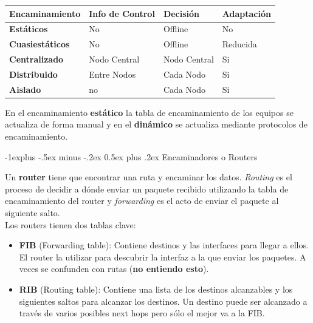 \documentclass[10pt,portrait, twocolumn]{article}
\makeatletter
\renewcommand{\subsection}{\@startsection{subsection}{2}{0mm}%
                                {-1explus -.5ex minus -.2ex}%
                                {0.5ex plus .2ex}%
                                {\normalfont\normalsize\bfseries}}
\makeatother
\begin{document}
\begin{center}
\begin{tabular}{|l|l|l|l|}
\hline
\textbf{Encaminamiento} & \textbf{Info de Control} & \textbf{Decisión} & \textbf{Adaptación} \\ \hline
\textbf{Estáticos}               & No                              & Offline                             & No                                \\ \hline
\textbf{Cuasiestáticos}          & No                              & Offline                             & Reducida                          \\ \hline
\textbf{Centralizado}            & Nodo Central                    & Nodo Central                        & Si                                \\ \hline
\textbf{Distribuido}             & Entre Nodos                     & Cada Nodo                           & Si                                \\ \hline
\textbf{Aislado}                 & no                              & Cada Nodo                           & Si                                \\ \hline
\end{tabular}
\end{center}

En el encaminamiento \textbf{estático} la tabla de encaminamiento de los equipos se actualiza de forma manual y en el \textbf{dinámico} se actualiza mediante protocolos de encaminamiento.

\subsection{Encaminadores o Routers}

Un \textbf{router} tiene que encontrar una ruta y encaminar los datos. \textit{Routing} es el proceso de decidir a dónde enviar un paquete recibido utilizando la tabla de encaminamiento del router y \textit{forwarding} es el acto de enviar el paquete al siguiente salto.\\

Los routers tienen dos tablas clave:

	\begin{itemize}
		\item \textbf{FIB} (Forwarding table): Contiene destinos y las interfaces para llegar a ellos. El router la utilizar para descubrir la interfaz a la que enviar los paquetes. A veces se confunden con rutas (\textbf{no entiendo esto}).
		\item \textbf{RIB} (Routing table): Contiene una lista de los destinos alcanzables y los siguientes saltos para alcanzar los destinos. Un destino puede ser alcanzado a través de varios posibles next hops pero sólo el mejor va a la FIB.
	\end{itemize}
	
\end{document}
